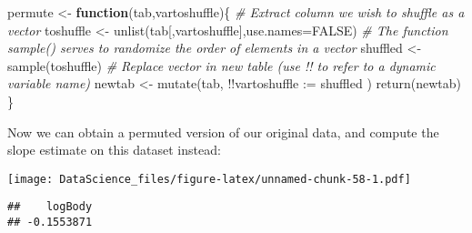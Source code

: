 \documentclass[
]{book}
\newenvironment{Shaded}{\begin{snugshade}}{\end{snugshade}}
\newcommand{\AttributeTok}[1]{\textcolor[rgb]{0.77,0.63,0.00}{#1}}
\newcommand{\CommentTok}[1]{\textcolor[rgb]{0.56,0.35,0.01}{\textit{#1}}}
\newcommand{\ConstantTok}[1]{\textcolor[rgb]{0.00,0.00,0.00}{#1}}
\newcommand{\ControlFlowTok}[1]{\textcolor[rgb]{0.13,0.29,0.53}{\textbf{#1}}}
\newcommand{\DecValTok}[1]{\textcolor[rgb]{0.00,0.00,0.81}{#1}}
\newcommand{\FunctionTok}[1]{\textcolor[rgb]{0.00,0.00,0.00}{#1}}
\newcommand{\NormalTok}[1]{#1}
\newcommand{\OtherTok}[1]{\textcolor[rgb]{0.56,0.35,0.01}{#1}}
\newcommand{\SpecialCharTok}[1]{\textcolor[rgb]{0.00,0.00,0.00}{#1}}
\newcommand{\StringTok}[1]{\textcolor[rgb]{0.31,0.60,0.02}{#1}}
\begin{document}
\begin{Shaded}
\begin{Highlighting}[]
\NormalTok{permute }\OtherTok{\textless{}{-}} \ControlFlowTok{function}\NormalTok{(tab,vartoshuffle)\{}
  \CommentTok{\# Extract column we wish to shuffle as a vector}
\NormalTok{  toshuffle }\OtherTok{\textless{}{-}} \FunctionTok{unlist}\NormalTok{(tab[,vartoshuffle],}\AttributeTok{use.names=}\ConstantTok{FALSE}\NormalTok{)}
  \CommentTok{\# The function sample() serves to randomize the order of elements in a vector}
\NormalTok{  shuffled }\OtherTok{\textless{}{-}} \FunctionTok{sample}\NormalTok{(toshuffle)}
  \CommentTok{\# Replace vector in new table (use !! to refer to a dynamic variable name)}
\NormalTok{  newtab }\OtherTok{\textless{}{-}} \FunctionTok{mutate}\NormalTok{(tab, }\SpecialCharTok{!!}\AttributeTok{vartoshuffle :=}\NormalTok{ shuffled )}
  \FunctionTok{return}\NormalTok{(newtab)}
\NormalTok{\}}
\end{Highlighting}
\end{Shaded}

Now we can obtain a permuted version of our original data, and compute the slope estimate on this dataset instead:

\begin{Shaded}
\end{Shaded}

\texttt{[image: DataScience\_files/figure-latex/unnamed-chunk-58-1.pdf]}

\begin{Shaded}
\end{Shaded}

\begin{verbatim}
##    logBody 
## -0.1553871
\end{verbatim}
\end{document}
